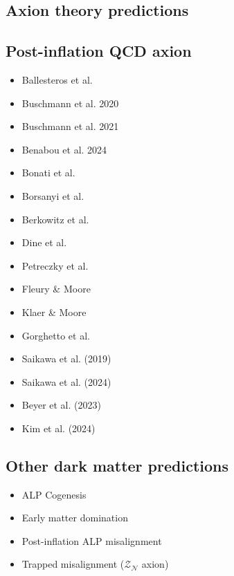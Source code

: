 \documentclass[8pt,twocolumn]{extarticle}
\begin{document}
\begin{mdframed}
\vspace{-1em}
\section{Axion theory predictions}\vspace{-0.5em}
\subsection{Post-inflation QCD axion}
\begin{itemize}\setlength\itemsep{-0.5em}
	\item Ballesteros et al.~\cite{Ballesteros:2016euj}	
	\item Buschmann et al. 2020~\cite{Buschmann:2019icd}
	\item Buschmann et al. 2021~\cite{Buschmann:2021sdq}
	\item Benabou et al. 2024~\cite{Benabou:2024msj}
	\item Bonati et al.~\cite{Bonati:2015vqz}
	\item Borsanyi et al.~\cite{Borsanyi:2016ksw}
	\item Berkowitz et al.~\cite{Berkowitz:2015aua}
	\item Dine et al.~\cite{Dine:2017swf}
	\item Petreczky et al.~\cite{Petreczky:2016vrs}
	\item Fleury \& Moore~\cite{Fleury:2015aca}
	\item Klaer \& Moore~\cite{Klaer:2017ond}
	\item Gorghetto et al.~\cite{Gorghetto:2021fsn}
	\item Saikawa et al. (2019)~\cite{IAXO:2019mpb}	
	\item Saikawa et al. (2024)~\cite{Saikawa:2024bta}
	\item Beyer et al. (2023)~\cite{Beyer:2022ywc}
	\item Kim et al. (2024)~\cite{Kim:2024wku}
\end{itemize}

\subsection{Other dark matter predictions}
\begin{itemize}\setlength\itemsep{-0.5em}
	\item ALP Cogenesis~\cite{Co:2020xlh}
	\item Early matter domination~\cite{Blinov:2019rhb}
	\item Post-inflation ALP misalignment~\cite{Arias:2012az,OHare:2021zrq}
	\item Trapped misalignment ($\mathcal{Z}_\mathcal{N}$ axion)~\cite{DiLuzio:2021gos}
\end{itemize}
\end{mdframed}
\end{document}
